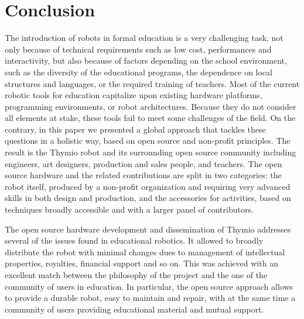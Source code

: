 \documentclass[letterpaper, 10 pt, conference]{ieeeconf}  %
\begin{document}
\section{Conclusion}

The introduction of robots in formal education is a very challenging task, not only because of technical requirements such as low cost, performances and interactivity, but also because of factors depending on the school environment, such as the diversity of the educational programs, the dependence on local structures and languages, or the required training of teachers.
Most of the current robotic tools for education capitalize upon existing hardware platforms, programming environments, or robot architectures.
Because they do not consider all elements at stake, these tools fail to meet some challenges of the field.
On the contrary, in this paper we presented a global approach that tackles these questions in a holistic way, based on open source and non-profit principles.
The result is the Thymio robot and its surrounding open source community including engineers, art designers, production and sales people, and teachers.
The open source hardware and the related contributions are split in two categories: the robot itself, produced by a non-profit organization and requiring very advanced skills in both design and production, and the accessories for activities, based on techniques broadly accessible and with a larger panel of contributors.

The open source hardware development and dissemination of Thymio addresses several of the issues found in educational robotics.
It allowed to broadly distribute the robot with minimal changes dues to management of intellectual properties, royalties, financial support and so on.
This was achieved with an excellent match between the philosophy of the project and the one of the community of users in education.
In particular, the open source approach allows to provide a durable robot, easy to maintain and repair, with at the same time a community of users providing educational material and mutual support.
\end{document}
